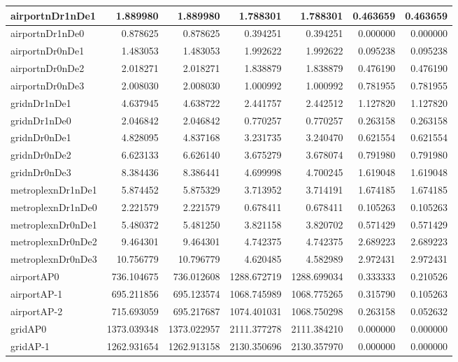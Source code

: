 \begin{longtable}{|l|r|r|r|r|r|r|}
\endlastfoot
airportnDr1nDe1 & 1.889980 & 1.889980 & 1.788301 & 1.788301 & 0.463659 & 0.463659 \\ \hline
airportnDr1nDe0 & 0.878625 & 0.878625 & 0.394251 & 0.394251 & 0.000000 & 0.000000 \\ \hline
airportnDr0nDe1 & 1.483053 & 1.483053 & 1.992622 & 1.992622 & 0.095238 & 0.095238 \\ \hline
airportnDr0nDe2 & 2.018271 & 2.018271 & 1.838879 & 1.838879 & 0.476190 & 0.476190 \\ \hline
airportnDr0nDe3 & 2.008030 & 2.008030 & 1.000992 & 1.000992 & 0.781955 & 0.781955 \\ \hline
gridnDr1nDe1 & 4.637945 & 4.638722 & 2.441757 & 2.442512 & 1.127820 & 1.127820 \\ \hline
gridnDr1nDe0 & 2.046842 & 2.046842 & 0.770257 & 0.770257 & 0.263158 & 0.263158 \\ \hline
gridnDr0nDe1 & 4.828095 & 4.837168 & 3.231735 & 3.240470 & 0.621554 & 0.621554 \\ \hline
gridnDr0nDe2 & 6.623133 & 6.626140 & 3.675279 & 3.678074 & 0.791980 & 0.791980 \\ \hline
gridnDr0nDe3 & 8.384436 & 8.386441 & 4.699998 & 4.700245 & 1.619048 & 1.619048 \\ \hline
metroplexnDr1nDe1 & 5.874452 & 5.875329 & 3.713952 & 3.714191 & 1.674185 & 1.674185 \\ \hline
metroplexnDr1nDe0 & 2.221579 & 2.221579 & 0.678411 & 0.678411 & 0.105263 & 0.105263 \\ \hline
metroplexnDr0nDe1 & 5.480372 & 5.481250 & 3.821158 & 3.820702 & 0.571429 & 0.571429 \\ \hline
metroplexnDr0nDe2 & 9.464301 & 9.464301 & 4.742375 & 4.742375 & 2.689223 & 2.689223 \\ \hline
metroplexnDr0nDe3 & 10.756779 & 10.796779 & 4.620485 & 4.582989 & 2.972431 & 2.972431 \\ \hline
airportAP0 & 736.104675 & 736.012608 & 1288.672719 & 1288.699034 & 0.333333 & 0.210526 \\ \hline
airportAP-1 & 695.211856 & 695.123574 & 1068.745989 & 1068.775265 & 0.315790 & 0.105263 \\ \hline
airportAP-2 & 715.693059 & 695.217687 & 1074.401031 & 1068.750298 & 0.263158 & 0.052632 \\ \hline
gridAP0 & 1373.039348 & 1373.022957 & 2111.377278 & 2111.384210 & 0.000000 & 0.000000 \\ \hline
gridAP-1 & 1262.931654 & 1262.913158 & 2130.350696 & 2130.357970 & 0.000000 & 0.000000 \\ \hline

\end{longtable}
